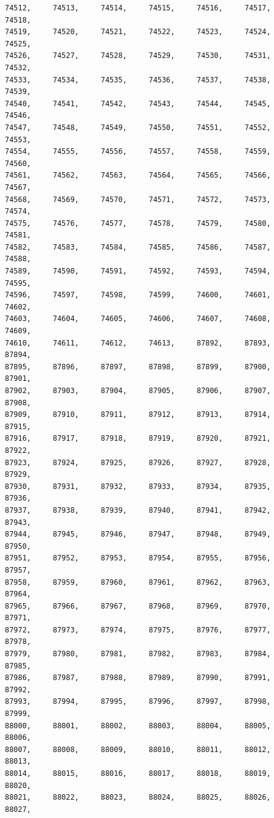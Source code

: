 \documentclass[a4paper,11pt]{report}
\begin{document}
\begin{verbatim}
74512,     74513,     74514,     74515,     74516,     74517,     74518,     
74519,     74520,     74521,     74522,     74523,     74524,     74525,     
74526,     74527,     74528,     74529,     74530,     74531,     74532,     
74533,     74534,     74535,     74536,     74537,     74538,     74539,     
74540,     74541,     74542,     74543,     74544,     74545,     74546,     
74547,     74548,     74549,     74550,     74551,     74552,     74553,     
74554,     74555,     74556,     74557,     74558,     74559,     74560,     
74561,     74562,     74563,     74564,     74565,     74566,     74567,     
74568,     74569,     74570,     74571,     74572,     74573,     74574,     
74575,     74576,     74577,     74578,     74579,     74580,     74581,     
74582,     74583,     74584,     74585,     74586,     74587,     74588,     
74589,     74590,     74591,     74592,     74593,     74594,     74595,     
74596,     74597,     74598,     74599,     74600,     74601,     74602,     
74603,     74604,     74605,     74606,     74607,     74608,     74609,     
74610,     74611,     74612,     74613,     87892,     87893,     87894,     
87895,     87896,     87897,     87898,     87899,     87900,     87901,     
87902,     87903,     87904,     87905,     87906,     87907,     87908,     
87909,     87910,     87911,     87912,     87913,     87914,     87915,     
87916,     87917,     87918,     87919,     87920,     87921,     87922,     
87923,     87924,     87925,     87926,     87927,     87928,     87929,     
87930,     87931,     87932,     87933,     87934,     87935,     87936,     
87937,     87938,     87939,     87940,     87941,     87942,     87943,     
87944,     87945,     87946,     87947,     87948,     87949,     87950,     
87951,     87952,     87953,     87954,     87955,     87956,     87957,     
87958,     87959,     87960,     87961,     87962,     87963,     87964,     
87965,     87966,     87967,     87968,     87969,     87970,     87971,     
87972,     87973,     87974,     87975,     87976,     87977,     87978,     
87979,     87980,     87981,     87982,     87983,     87984,     87985,     
87986,     87987,     87988,     87989,     87990,     87991,     87992,     
87993,     87994,     87995,     87996,     87997,     87998,     87999,     
88000,     88001,     88002,     88003,     88004,     88005,     88006,     
88007,     88008,     88009,     88010,     88011,     88012,     88013,     
88014,     88015,     88016,     88017,     88018,     88019,     88020,     
88021,     88022,     88023,     88024,     88025,     88026,     88027,     

\end{verbatim}
\end{document}
